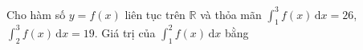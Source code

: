 \begin{ex}
Cho hàm số $y=f(x)$ liên tục trên $\mathbb R$ và thỏa mãn $\displaystyle\int_1^3f(x)\,\mathrm dx=26$, $\displaystyle\int_2^3f(x)\,\mathrm dx=19$. Giá trị của $\displaystyle\int_1^2f(x)\,\mathrm dx$ bằng
\end{ex}
